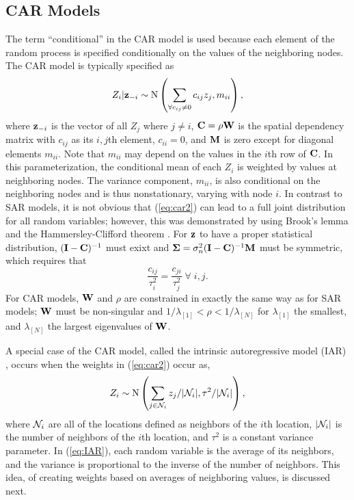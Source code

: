 \documentclass[11pt, titlepage]{article}\usepackage[]{graphicx}\usepackage[]{color}
\begin{document}


\subsection*{CAR Models}

The term ``conditional'' in the CAR model is used because each element of the random process is specified conditionally on the values of the neighboring nodes. The CAR model is typically specified as
\begin{equation}
				Z_i|\mathbf{z}_{-i} \sim \textrm{N}\left(\sum_{\forall c_{ij}\neq 0} c_{ij}z_j,m_{ii}\right),
  \label{eq:car2}
\end{equation}
where $\mathbf{z}_{-i}$ is the vector of all $Z_j$ where $j \ne i$, $\mathbf{C} =\rho\mathbf{W}$ is the spatial dependency matrix with $c_{ij}$ as its $i,j$th element, $c_{ii} = 0$, and $\mathbf{M}$ is zero except for diagonal elements $m_{ii}$. Note that $m_{ii}$ may depend on the values in the $i$th row of $\mathbf{C}$. In this parameterization, the conditional mean of each $Z_i$ is weighted by values at neighboring nodes. The variance component, $m_{ii}$, is also conditional on the neighboring nodes and is thus nonstationary, varying with node $i$.  In contrast to SAR models, it is not obvious that (\ref{eq:car2}) can lead to a full joint distribution for all random variables; however, this was demonstrated by \citet{Besa:spat:1974} using Brook's lemma \citep{Broo:dist:1964} and the Hammersley-Clifford theorem \citep{Hamm:Clif:Mark:1971,Clif:Mark:1990}. For $\mathbf{z}$ to have a proper statistical distribution, $(\mathbf{I}-\mathbf{C})^{-1}$ must exixt and $\mbox{\boldmath $\Sigma$} = \sigma^2_n(\mathbf{I}-\mathbf{C})^{-1}\mathbf{M}$ must be symmetric, which requires that
\begin{equation} \label{eq:CarSymmetry}
    \frac{c_{ij}}{\tau_i^2}=\frac{c_{ji}}{\tau_j^2} \; \forall \; i,j.
\end{equation}
For CAR models, $\mathbf{W}$ and $\rho$ are constrained in exactly the same way as for SAR models; $\mathbf{W}$ must be non-singular and $1/\lambda_{[1]} < \rho < 1/\lambda_{[N]}$ for $\lambda_{[1]}$ the smallest, and $\lambda_{[N]}$ the largest eigenvalues of $\mathbf{W}$.

A special case of the CAR model, called the intrinsic autoregressive model (IAR) \citep{Besa:Koop:cond:1995}, occurs when the weights in (\ref{eq:car2}) occur as,
\begin{equation} \label{eq:IAR}
 Z_i \sim \textrm{N}\left(\sum_{j \in \mathcal{N}_i} z_j/|\mathcal{N}_i|,\tau^2/|\mathcal{N}_i|\right),
\end{equation}
where $\mathcal{N}_i$ are all of the locations defined as neighbors of the $i$th location, $|\mathcal{N}_i|$ is the number of neighbors of the $i$th location, and $\tau^2$ is a constant variance parameter.  In (\ref{eq:IAR}), each random variable is the average of its neighbors, and the variance is proportional to the inverse of the number of neighbors.  This idea, of creating weights based on averages of neighboring values, is discussed next.
\end{document}
